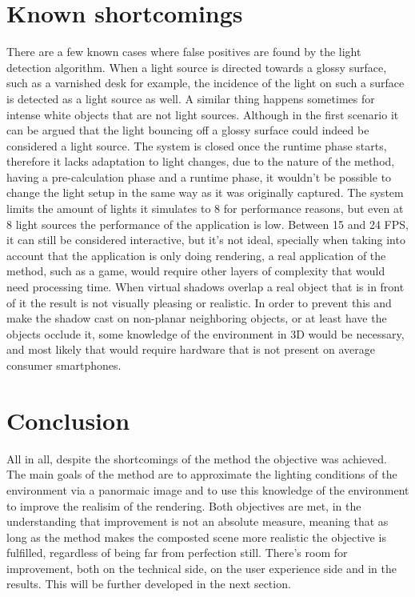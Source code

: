 \section{Known shortcomings}
There are a few known cases where false positives are found by the light detection algorithm. When a light source is directed towards a glossy surface, such as a varnished desk for example, the incidence of the light on such a surface is detected as a light source as well. A similar thing happens sometimes for intense white objects that are not light sources. Although in the first scenario it can be argued that the light bouncing off a glossy surface could indeed be considered a light source. The system is closed once the runtime phase starts, therefore it lacks adaptation to light changes, due to the nature of the method, having a pre-calculation phase and a runtime phase, it wouldn't be possible to change the light setup in the same way as it was originally captured.\newline
The system limits the amount of lights it simulates to 8 for performance reasons, but even at 8 light sources the performance of the application is low. Between 15 and 24 FPS, it can still be considered interactive, but it's not ideal, specially when taking into account that the application is only doing rendering, a real application of the method, such as a game, would require other layers of complexity that would need processing time.\newline
When virtual shadows overlap a real object that is in front of it the result is not visually pleasing or realistic. In order to prevent this and make the shadow cast on non-planar neighboring objects, or at least have the objects occlude it, some knowledge of the environment in 3D would be necessary, and most likely that would require hardware that is not present on average consumer smartphones.

\section{Conclusion}
All in all, despite the shortcomings of the method the objective was achieved. The main goals of the method are to approximate the lighting conditions of the environment via a panormaic image and to use this knowledge of the environment to improve the realisim of the rendering. Both objectives are met, in the understanding that improvement is not an absolute measure, meaning that as long as the method makes the composted scene more realistic the objective is fulfilled, regardless of being far from perfection still.\newline
There's room for improvement, both on the technical side, on the user experience side and in the results. This will be further developed in the next section.

